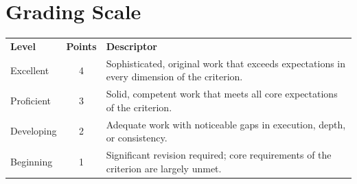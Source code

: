 \documentclass[11pt,a4paper]{scrartcl}
\begin{document}
\vspace{4mm}

\section*{Grading Scale}
\begin{tcolorbox}[colback=white,colframe=slate!60,boxrule=0.5pt,arc=2pt,left=9pt,right=9pt,top=6pt,bottom=6pt]
\small
\begin{tabularx}{\linewidth}{@{}l c X@{}}
\rowcolor{inkblue}
\color{white}\bfseries Level & \color{white}\bfseries Points & \color{white}\bfseries Descriptor \\
Excellent & 4 & Sophisticated, original work that exceeds expectations in every dimension of the criterion. \\
\rowcolor{paper}
Proficient & 3 & Solid, competent work that meets all core expectations of the criterion. \\
Developing & 2 & Adequate work with noticeable gaps in execution, depth, or consistency. \\
\rowcolor{paper}
Beginning & 1 & Significant revision required; core requirements of the criterion are largely unmet. \\
\end{tabularx}
\end{tcolorbox}

\vspace{5mm}
\end{document}
